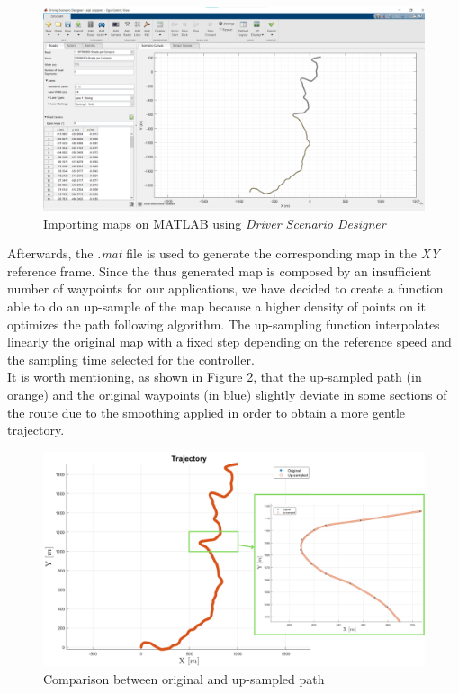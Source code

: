 \begin{figure}[H]
    \centering
    \includegraphics[width=1\textwidth]{Figures/DrivingScenarioTool.png}
    \caption{Importing maps on MATLAB using \textit{Driver Scenario Designer}}
      \label{fig:DrivingScenarioTool}
\end{figure}

Afterwards, the \textit{.mat} file is used to generate the corresponding map in the \textit{XY} reference frame.
Since the thus generated map is composed by an insufficient number of waypoints for our applications, we have decided to create a function able to do an up-sample of the map because a higher density of points on it optimizes the path following algorithm. The up-sampling function interpolates linearly the original map with a fixed step depending on the reference speed and the sampling time selected for the controller. \\
It is worth mentioning, as shown in Figure \ref{fig:UpSample}, that the up-sampled path (in orange) and the original waypoints (in blue) slightly deviate in some sections of the route due to the smoothing applied in order to obtain a more gentle trajectory.

\begin{figure}[H]
    \centering
    \includegraphics[width=1\textwidth]{Figures/UpSample.png}
    \caption{Comparison between original and up-sampled path}
      \label{fig:UpSample}
\end{figure}


